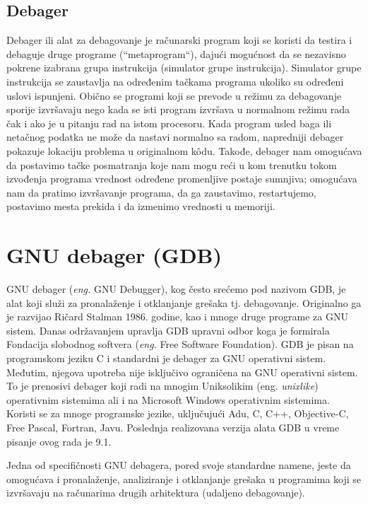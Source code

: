 \documentclass[a4paper]{article}
\begin{document}
\subsection{Debager}
\label{subsec:debager}
Debager ili alat za debagovanje je računarski program koji se koristi da testira i 
debaguje druge programe (``metaprogram``), dajući mogućnost da se nezavisno 
pokrene izabrana grupa instrukcija (simulator grupe instrukcija). Simulator grupe instrukcija se zaustavlja
na određenim tačkama programa ukoliko su određeni uslovi ispunjeni.
Obično se programi koji se prevode u režimu za debagovanje
sporije izvršavaju nego kada se isti program izvršava u normalnom režimu rada čak i ako je 
u pitanju rad na istom procesoru\cite{debugger}.  Kada program usled baga ili netačnog podatka ne može da 
nastavi normalno sa radom, napredniji debager pokazuje lokaciju problema u originalnom k\^{o}du. Takođe,
debager nam omogućava da postavimo tačke posmatranja koje nam
mogu reći u kom trenutku tokom izvođenja programa vrednost
određene promenljive postaje sumnjiva; omogućava nam da
pratimo izvršavanje programa, da ga zaustavimo, restartujemo,
postavimo mesta prekida i da izmenimo vrednosti u memoriji. 

\section{GNU debager (GDB)}
\label{sec:GDB}
GNU debager (\textit{eng.} GNU Debugger), kog često srećemo pod nazivom GDB, je alat koji služi za pronalaženje 
i otklanjanje grešaka tj. debagovanje. Originalno ga je razvijao Ričard Stalman 1986. godine, kao i mnoge druge programe 
za GNU sistem\cite{gdb}. Danas održavanjem upravlja GDB upravni odbor koga je formirala Fondacija 
slobodnog softvera (\textit{eng.} Free Software Foundation).
GDB je pisan na programskom jeziku C i standardni je debager za GNU operativni sistem. 
Međutim, njegova upotreba nije isključivo ograničena na GNU operativni sistem. To je prenosivi debager
koji radi na mnogim Uniksolikim (eng. \textit{unixlike}) operativnim sistemima ali i na Microsoft Windows operativnim 
sistemima. Koristi se za mnoge programske jezike, uključujući
Adu, C, C++, Objective-C, Free Pascal, Fortran, Javu.
Poslednja realizovana verzija alata GDB u vreme pisanje ovog rada je 9.1\cite{sourceware}. 

Jedna od specifičnosti GNU debagera, pored svoje standardne namene, jeste da omogućava i 
pronalaženje, analiziranje i otklanjanje grešaka u programima koji se izvršavaju na računarima drugih 
arhitektura (udaljeno debagovanje)\cite{master_rad}.
\end{document}
